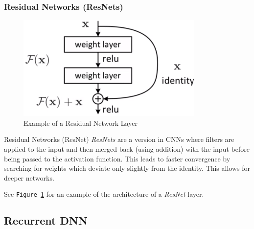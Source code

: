\documentclass[11pt,a4paper]{article}
\begin{document}
\subsubsection{Residual Networks (ResNets)} \label{sec_ResNets}

  \begin{figure}[ht!]
    \centering
    \includegraphics[width=.35\textwidth]{ResNet.PNG}
    \caption{Example of a Residual Network Layer}
    \label{fig_ResNet}
  \end{figure}

  \begin{proposition}{Residual Networks (ResNet)}
    \textit{ResNets} are a version in CNNs where filters are applied to the input and then merged back (using addition) with the input before being passed to the activation function. This leads to faster convergence by searching for weights which deviate only slightly from the identity. This allows for deeper networks.
    \par See \texttt{Figure \ref{fig_ResNet}} for an example of the architecture of a \textit{ResNet} layer.
  \end{proposition}

\subsection{Recurrent DNN} \label{sec_RNNs}
\end{document}
